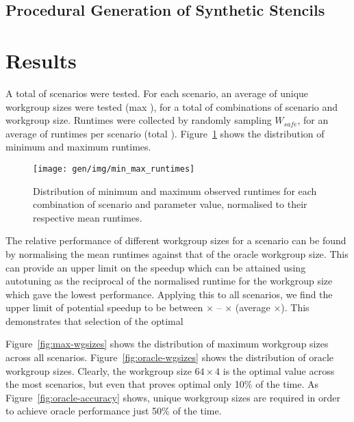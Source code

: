 \subsection{Procedural Generation of Synthetic Stencils}




\section{Results}

A total of  scenarios were tested. For each
scenario, an average of  unique workgroup
sizes were tested (max ), for a total of
 combinations of scenario and workgroup
size. Runtimes were collected by randomly sampling $W_{safe}$, for an
average of  runtimes per scenario (total
). Figure~\ref{fig:min-max-runtimes} shows the
distribution of minimum and maximum runtimes.

\begin{figure}
\centering
\texttt{[image: gen/img/min\_max\_runtimes]}
\caption{%
  Distribution of minimum and maximum observed runtimes for each
  combination of scenario and parameter value, normalised to their
  respective mean runtimes.%
}
\label{fig:min-max-runtimes}
\end{figure}

The relative performance of different workgroup sizes for a scenario
can be found by normalising the mean runtimes against that of the
oracle workgroup size. This can provide an upper limit on the speedup
which can be attained using autotuning as the reciprocal of the
normalised runtime for the workgroup size which gave the lowest
performance. Applying this to all scenarios, we find the upper limit
of potential speedup to be between
$\times$ --
$\times$ (average
$\times$). This demonstrates that
selection of the optimal

Figure~\ref{fig:max-wgsizes} shows the distribution of maximum
workgroup sizes across all scenarios. Figure~\ref{fig:oracle-wgsizes}
shows the distribution of oracle workgroup sizes. Clearly, the
workgroup size $64 \times 4$ is the optimal value across the most
scenarios, but even that proves optimal only 10\% of the time. As
Figure~\ref{fig:oracle-accuracy} shows,
 unique workgroup sizes are
required in order to achieve oracle performance just 50\% of the time.

